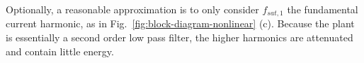 \documentclass{ifacconf}
\begin{document}

Optionally, a reasonable approximation is to only consider $f_{sat,1}$ the fundamental current harmonic, as in Fig.~\ref{fig:block-diagram-nonlinear} (c). Because the plant is essentially a second order low pass filter, the higher harmonics are attenuated and contain little energy. %


\end{document}
